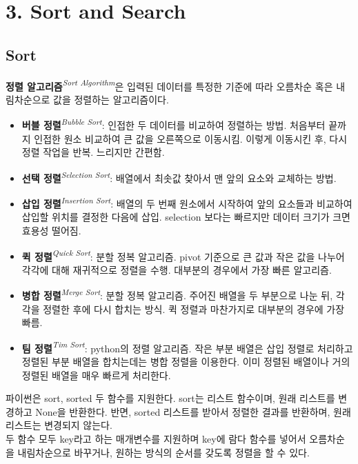 \section[3. Sort and Search - {\it 정렬과 검색}]{3. Sort and Search}

\subsection{Sort}

\textbf{정렬 알고리즘}\textit{\textsuperscript{Sort Algorithm}}은 입력된 데이터를 특정한 기준에 따라 오름차순 혹은 내림차순으로 값을 정렬하는 알고리즘이다.
\begin{itemize}
\item \textbf{버블 정렬}\textit{\textsuperscript{Bubble Sort}}: 인접한 두 데이터를 비교하여 정렬하는 방법. 처음부터 끝까지 인접한 원소 비교하여 큰 값을 오른쪽으로 이동시킴. 이렇게 이동시킨 후, 다시 정렬 작업을 반복. 느리지만 간편함.
\item \textbf{선택 정렬}\textit{\textsuperscript{Selection Sort}}: 배열에서 최솟값 찾아서 맨 앞의 요소와 교체하는 방법.
\item \textbf{삽입 정렬}\textit{\textsuperscript{Insertion Sort}}: 배열의 두 번째 원소에서 시작하여 앞의 요소들과 비교하여 삽입할 위치를 결정한 다음에 삽입. selection 보다는 빠르지만 데이터 크기가 크면 효용성 떨어짐.
\item \textbf{퀵 정렬}\textit{\textsuperscript{Quick Sort}}: 분할 정복 알고리즘. pivot 기준으로 큰 값과 작은 값을 나누어 각각에 대해 재귀적으로 정렬을 수행. 대부분의 경우에서 가장 빠른 알고리즘.
\item \textbf{병합 정렬}\textit{\textsuperscript{Merge Sort}}: 분할 정복 알고리즘. 주어진 배열을 두 부분으로 나눈 뒤, 각각을 정렬한 후에 다시 합치는 방식. 퀵 정렬과 마찬가지로 대부분의 경우에 가장 빠름.
\item \textbf{팀 정렬}\textit{\textsuperscript{Tim Sort}}: python의 정렬 알고리즘. 작은 부분 배열은 삽입 정렬로 처리하고 정렬된 부분 배열을 합치는데는 병합 정렬을 이용한다. 이미 정렬된 배열이나 거의 정렬된 배열을 매우 빠르게 처리한다.
\end{itemize}

파이썬은 sort, sorted 두 함수를 지원한다. sort는 리스트 함수이며, 원래 리스트를 변경하고 None을 반환한다. 반면, sorted 리스트를 받아서 정렬한 결과를 반환하며, 원래 리스트는 변경되지 않는다.\\
두 함수 모두 key라고 하는 매개변수를 지원하며 key에 람다 함수를 넣어서 오름차순을 내림차순으로 바꾸거나, 원하는 방식의 순서를 갖도록 정렬을 할 수 있다.

